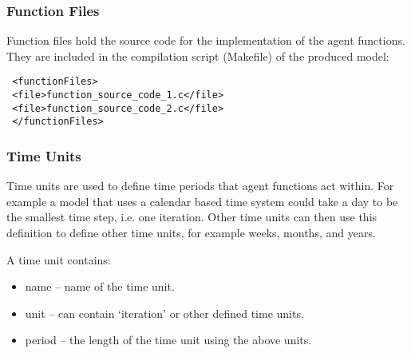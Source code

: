 %
%
%

\subsubsection{Function Files}

Function files hold the source code for the implementation of the
agent functions.
They are included in the compilation script (Makefile) of the produced model:

\begin{mylisting}
\begin{verbatim}
 <functionFiles>
 <file>function_source_code_1.c</file>
 <file>function_source_code_2.c</file>
 </functionFiles>
\end{verbatim}
\end{mylisting}

\subsubsection{Time Units}
\label{timeunit}


Time units are used to define time periods that agent functions act within. For
example a model that uses a calendar based time system could take a day to be
the smallest time step, i.e. one iteration. Other time units can then use this
definition to define other time units, for example weeks, months, and years.

A time unit contains:

\begin{itemize}
\item name -- name of the time unit.
\item unit -- can contain `iteration' or other defined time units.
\item period -- the length of the time unit using the above units.
\end{itemize}

